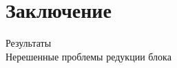 \section{Заключение}
\label{sec:Chapter5} 

Результаты\\
Нерешенные проблемы редукции блока

\newpage
